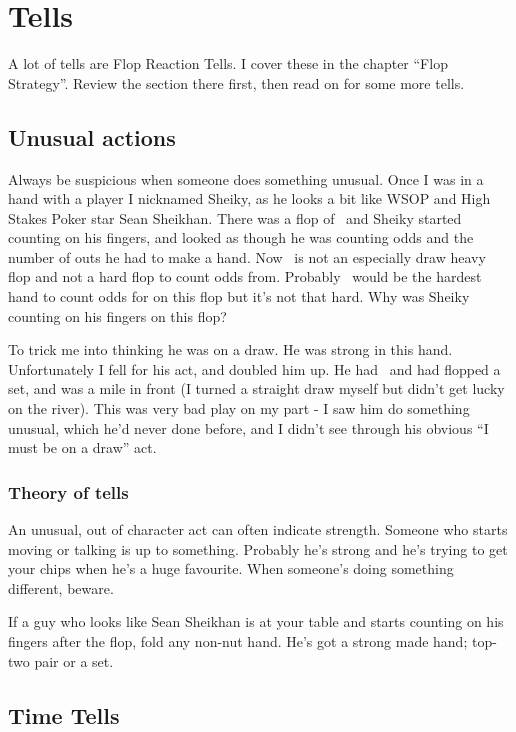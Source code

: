 \chapter{Tells}


A lot of tells are Flop Reaction Tells. I cover these in
the chapter ``Flop Strategy''. Review the section there first, then
read on for some more tells.

\section{Unusual actions}

Always be suspicious when someone does something unusual.
Once I was in a hand with a player I nicknamed Sheiky, as
he looks a bit like WSOP and High Stakes Poker star Sean Sheikhan.
There was a flop of \Kc\nined\sevd\, and Sheiky started counting on his
fingers, and looked as though he was counting odds and the number
of outs he had to make a hand. Now \Kc\nined\sevd\ is not an especially
draw heavy flop and not a hard flop to count odds from. Probably
\Qd\tens\ would be the hardest hand to count odds for on this flop but
it's not that hard. Why was Sheiky counting on his fingers on this
flop?

To trick me into thinking he was on a draw. He was strong in
this hand. Unfortunately I fell for his act, and doubled him up.
He had \ninec\nineh\, and had flopped a set, and was a mile in front (I turned
a straight draw myself but didn't get lucky on the river). This
was very bad play on my part - I saw him do something unusual, which
he'd never done before, and I didn't see through his obvious
``I must be on a draw'' act.

\subsection{Theory of tells}

An unusual, out of character act can often indicate
strength. Someone who starts moving or talking is up to something.
Probably he's strong and he's trying to get your chips when he's
a huge favourite. When someone's doing something different, beware.

If a guy who looks like Sean Sheikhan is at your table and starts
counting on his fingers after the flop, fold any non-nut hand. He's
got a strong made hand; top-two pair or a set.

\section{Time Tells}

